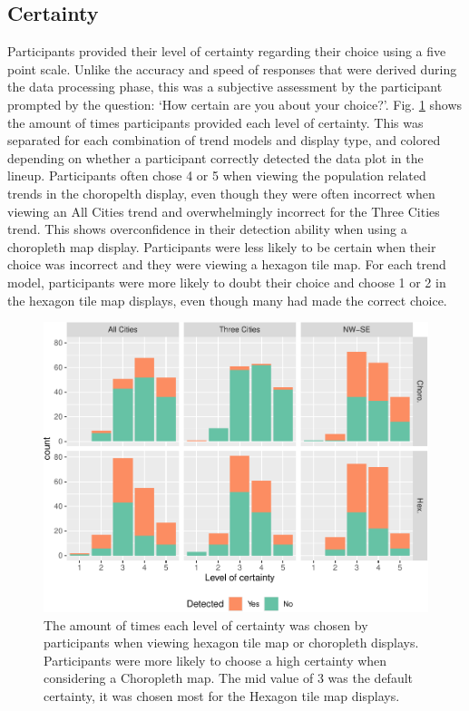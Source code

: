 \documentclass[
]{article}
\begin{document}
\subsection{Certainty}\label{certainty}

Participants provided their level of certainty regarding their choice
using a five point scale. Unlike the accuracy and speed of responses
that were derived during the data processing phase, this was a
subjective assessment by the participant prompted by the question: `How
certain are you about your choice?'. Fig. \ref{fig:certainty} shows the
amount of times participants provided each level of certainty. This was
separated for each combination of trend models and display type, and
colored depending on whether a participant correctly detected the data
plot in the lineup. Participants often chose 4 or 5 when viewing the
population related trends in the choropelth display, even though they
were often incorrect when viewing an All Cities trend and overwhelmingly
incorrect for the Three Cities trend. This shows overconfidence in their
detection ability when using a choropleth map display. Participants were
less likely to be certain when their choice was incorrect and they were
viewing a hexagon tile map. For each trend model, participants were more
likely to doubt their choice and choose 1 or 2 in the hexagon tile map
displays, even though many had made the correct choice.

\begin{figure}
\includegraphics[width=1\linewidth]{paper_files/figure-latex/certainty-1} \caption{The amount of times each level of certainty was chosen by participants when viewing hexagon tile map or choropleth displays. Participants were more likely to choose a high certainty when considering a Choropleth map. The mid value of 3 was the default certainty, it was chosen most for the Hexagon tile map displays.}\label{fig:certainty}
\end{figure}
\end{document}
